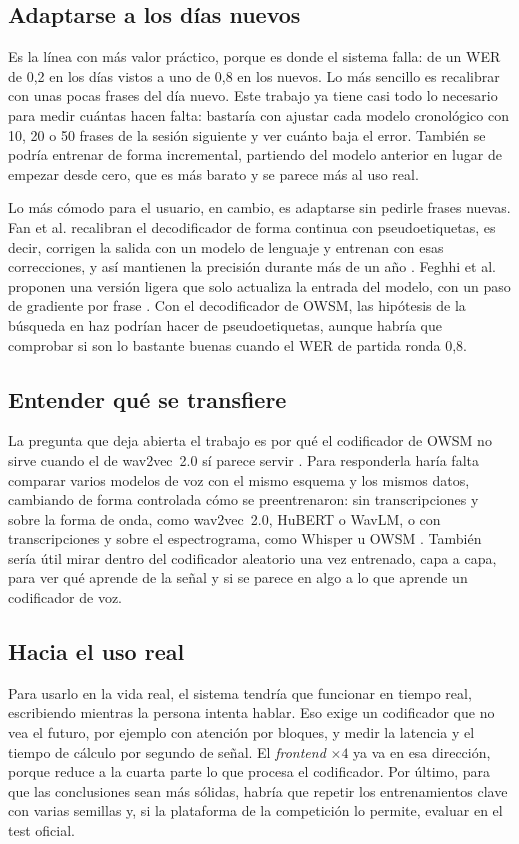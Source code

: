 \subsection{Adaptarse a los días nuevos}
\label{sec:futuro-dias-nuevos}

Es la línea con más valor práctico, porque es donde el sistema falla: de un WER de 0,2 en los días vistos a uno de 0,8 en los nuevos. Lo más sencillo es recalibrar con unas pocas frases del día nuevo. Este trabajo ya tiene casi todo lo necesario para medir cuántas hacen falta: bastaría con ajustar cada modelo cronológico con 10, 20 o 50 frases de la sesión siguiente y ver cuánto baja el error. También se podría entrenar de forma incremental, partiendo del modelo anterior en lugar de empezar desde cero, que es más barato y se parece más al uso real.

Lo más cómodo para el usuario, en cambio, es adaptarse sin pedirle frases nuevas. Fan et al. recalibran el decodificador de forma continua con pseudoetiquetas, es decir, corrigen la salida con un modelo de lenguaje y entrenan con esas correcciones, y así mantienen la precisión durante más de un año \cite{fan2023corp}. Feghhi et al. proponen una versión ligera que solo actualiza la entrada del modelo, con un paso de gradiente por frase \cite{feghhi2025timemasked}. Con el decodificador de OWSM, las hipótesis de la búsqueda en haz podrían hacer de pseudoetiquetas, aunque habría que comprobar si son lo bastante buenas cuando el WER de partida ronda 0,8.

\subsection{Entender qué se transfiere}

La pregunta que deja abierta el trabajo es por qué el codificador de OWSM no sirve cuando el de wav2vec~2.0 sí parece servir \cite{fiedler2025wav2vec2brain}. Para responderla haría falta comparar varios modelos de voz con el mismo esquema y los mismos datos, cambiando de forma controlada cómo se preentrenaron: sin transcripciones y sobre la forma de onda, como wav2vec~2.0, HuBERT o WavLM, o con transcripciones y sobre el espectrograma, como Whisper u OWSM \cite{baevski2020wav2vec,hsu2021hubert,chen2022wavlm,radford2023whisper}. También sería útil mirar dentro del codificador aleatorio una vez entrenado, capa a capa, para ver qué aprende de la señal y si se parece en algo a lo que aprende un codificador de voz.

\subsection{Hacia el uso real}

Para usarlo en la vida real, el sistema tendría que funcionar en tiempo real, escribiendo mientras la persona intenta hablar. Eso exige un codificador que no vea el futuro, por ejemplo con atención por bloques, y medir la latencia y el tiempo de cálculo por segundo de señal. El \textit{frontend} $\times 4$ ya va en esa dirección, porque reduce a la cuarta parte lo que procesa el codificador. Por último, para que las conclusiones sean más sólidas, habría que repetir los entrenamientos clave con varias semillas y, si la plataforma de la competición lo permite, evaluar en el test oficial.
